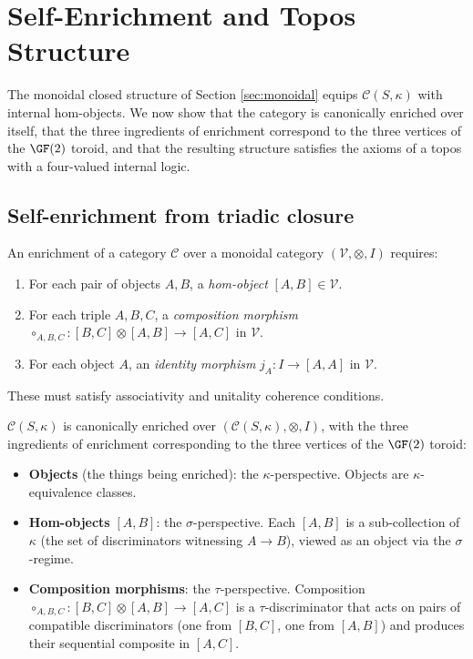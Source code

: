 \section{Self-Enrichment and Topos Structure}\label{sec:topos}

The monoidal closed structure of Section \ref{sec:monoidal}
equips $\mathcal{C}(S,\kappa)$ with internal hom-objects.
We now show that the category is canonically enriched over
itself, that the three ingredients of enrichment correspond
to the three vertices of the $\GF(2)$ toroid, and that the
resulting structure satisfies the axioms of a topos with a
four-valued internal logic.

\subsection{Self-enrichment from triadic closure}

\begin{definition}\label{def:enrichment-data}
An enrichment of a category $\mathcal{C}$ over a monoidal
category $(\mathcal{V}, \otimes, I)$ requires:
\begin{enumerate}[label=(\roman*),nosep]
  \item For each pair of objects $A, B$, a \emph{hom-object}
    $[A,B] \in \mathcal{V}$.
  \item For each triple $A, B, C$, a \emph{composition
    morphism} $\circ_{A,B,C}: [B,C] \otimes [A,B] \to [A,C]$
    in $\mathcal{V}$.
  \item For each object $A$, an \emph{identity morphism}
    $j_A: I \to [A,A]$ in $\mathcal{V}$.
\end{enumerate}
These must satisfy associativity and unitality coherence
conditions.
\end{definition}

\begin{theorem}\label{thm:self-enrich}
$\mathcal{C}(S,\kappa)$ is canonically enriched over
$(\mathcal{C}(S,\kappa), \otimes, I)$, with the three
ingredients of enrichment corresponding to the three
vertices of the $\GF(2)$ toroid:
\begin{itemize}[nosep]
  \item \textbf{Objects} (the things being enriched): the
    $\kappa$-perspective. Objects are $\kappa$-equivalence
    classes.
  \item \textbf{Hom-objects} $[A,B]$: the $\sigma$-perspective.
    Each $[A,B]$ is a sub-collection of $\kappa$ (the set
    of discriminators witnessing $A \to B$), viewed as an
    object via the $\sigma$-regime.
  \item \textbf{Composition morphisms}: the $\tau$-perspective.
    Composition $\circ_{A,B,C}: [B,C] \otimes [A,B] \to [A,C]$
    is a $\tau$-discriminator that acts on pairs of
    compatible discriminators (one from $[B,C]$, one from
    $[A,B]$) and produces their sequential composite
    in $[A,C]$.
\end{itemize}
\end{theorem}

